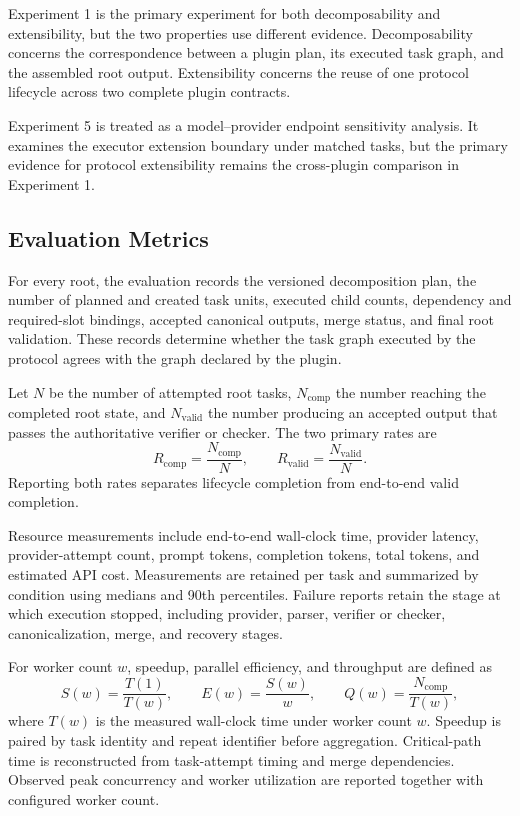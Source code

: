 \documentclass{article}
\theoremstyle{plain}
\begin{document}
Experiment 1 is the primary experiment for both decomposability and
extensibility, but the two properties use different evidence.
Decomposability concerns the correspondence between a plugin plan, its
executed task graph, and the assembled root output. Extensibility concerns
the reuse of one protocol lifecycle across two complete plugin contracts.

Experiment 5 is treated as a model--provider endpoint sensitivity analysis.
It examines the executor extension boundary under matched tasks, but the
primary evidence for protocol extensibility remains the cross-plugin
comparison in Experiment 1.


\subsection{Evaluation Metrics}

For every root, the evaluation records the versioned decomposition plan,
the number of planned and created task units, executed child counts,
dependency and required-slot bindings, accepted canonical outputs, merge
status, and final root validation. These records determine whether the
task graph executed by the protocol agrees with the graph declared by the
plugin.

Let \(N\) be the number of attempted root tasks,
\(N_{\mathrm{comp}}\) the number reaching the completed root state, and
\(N_{\mathrm{valid}}\) the number producing an accepted output that passes
the authoritative verifier or checker. The two primary rates are
\[
R_{\mathrm{comp}}
=
\frac{N_{\mathrm{comp}}}{N},
\qquad
R_{\mathrm{valid}}
=
\frac{N_{\mathrm{valid}}}{N}.
\]
Reporting both rates separates lifecycle completion from end-to-end valid
completion.

Resource measurements include end-to-end wall-clock time, provider
latency, provider-attempt count, prompt tokens, completion tokens, total
tokens, and estimated API cost. Measurements are retained per task and
summarized by condition using medians and 90th percentiles. Failure reports
retain the stage at which execution stopped, including provider, parser,
verifier or checker, canonicalization, merge, and recovery stages.

For worker count \(w\), speedup, parallel efficiency, and throughput are
defined as
\[
S(w)=\frac{T(1)}{T(w)},
\qquad
E(w)=\frac{S(w)}{w},
\qquad
Q(w)=\frac{N_{\mathrm{comp}}}{T(w)},
\]
where \(T(w)\) is the measured wall-clock time under worker count \(w\).
Speedup is paired by task identity and repeat identifier before
aggregation. Critical-path time is reconstructed from task-attempt timing
and merge dependencies. Observed peak concurrency and worker utilization
are reported together with configured worker count.
\end{document}
